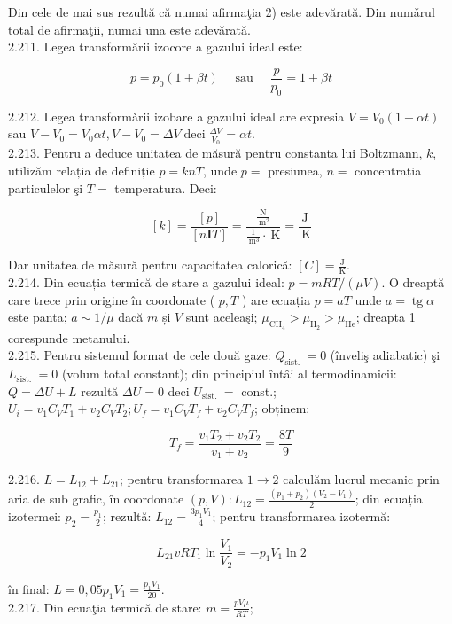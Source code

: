 \documentclass[10pt]{article}
\begin{document}
Din cele de mai sus rezultă că numai afirmaţia 2) este adevărată. Din numǎrul total de afirmaţii, numai una este adevărată.\\
2.211. Legea transformării izocore a gazului ideal este:

$$
p=p_{0}(1+\beta t) \quad \text { sau } \quad \frac{p}{p_{0}}=1+\beta t
$$

2.212. Legea transformǎrii izobare a gazului ideal are expresia $V=V_{0}(1+\alpha t)$ sau $V-V_{0}=V_{0} \alpha t, V-V_{0}=\Delta V \operatorname{deci} \frac{\Delta V}{V_{0}}=\alpha t$.\\
2.213. Pentru a deduce unitatea de măsură pentru constanta lui Boltzmann, $k$, utilizăm relația de definiție $p=k n T$, unde $p=$ presiunea, $n=$ concentrația particulelor şi $T=$ temperatura. Deci:

$$
[k]=\frac{[p]}{[n \mathbf{I} T]}=\frac{\frac{\mathrm{N}}{\mathrm{~m}^{2}}}{\frac{1}{\mathrm{~m}^{3}} \cdot \mathrm{~K}}=\frac{\mathrm{J}}{\mathrm{~K}}
$$

Dar unitatea de măsură pentru capacitatea calorică: $[C]=\frac{\mathrm{J}}{\mathrm{K}}$.\\
2.214. Din ecuația termică de stare a gazului ideal: $p=m R T /(\mu V)$. O dreaptă care trece prin origine în coordonate ( $p, T$ ) are ecuația $p=a T$ unde $a=\operatorname{tg} \alpha$ este panta; $a \sim 1 / \mu$ dacă $m$ și $V$ sunt aceleaşi; $\mu_{\mathrm{CH}_{4}}>\mu_{\mathrm{H}_{2}}>\mu_{\mathrm{He}}$; dreapta 1 corespunde metanului.\\
2.215. Pentru sistemul format de cele două gaze: $Q_{\text {sist. }}=0$ (înveliş adiabatic) şi $L_{\text {sist. }}=0$ (volum total constant); din principiul întâi al termodinamicii: $Q=\Delta U+L$ rezultă $\Delta U=0$ deci $U_{\text {sist. }}=$ const.; $U_{i}=v_{1} C_{V} T_{1}+v_{2} C_{V} T_{2} ; U_{f}=v_{1} C_{V} T_{f}+v_{2} C_{V} T_{f}$; obținem:

$$
T_{f}=\frac{v_{1} T_{2}+v_{2} T_{2}}{v_{1}+v_{2}}=\frac{8 T}{9}
$$

2.216. $L=L_{12}+L_{21}$; pentru transformarea $1 \rightarrow 2$ calculăm lucrul mecanic prin aria de sub grafic, în coordonate $(p, V): L_{12}=\frac{\left(p_{1}+p_{2}\right)\left(V_{2}-V_{1}\right)}{2}$; din ecuația izotermei: $p_{2}=\frac{p_{1}}{2}$; rezultă: $L_{12}=\frac{3 p_{1} V_{1}}{4}$; pentru transformarea izotermă:

$$
L_{21} v R T_{1} \ln \frac{V_{1}}{V_{2}}=-p_{1} V_{1} \ln 2
$$

în final: $L=0,05 p_{1} V_{1}=\frac{p_{1} V_{1}}{20}$.\\
2.217. Din ecuaţia termică de stare: $m=\frac{p V \mu}{R T}$;
\end{document}
